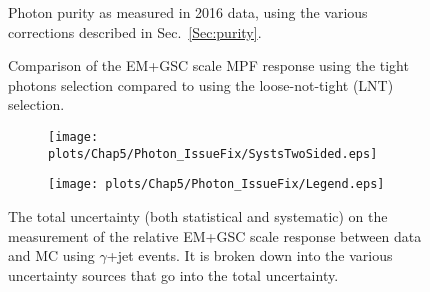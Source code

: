 \begin{figure}[!ht]
  \begin{center}
  \end{center}
  \caption[Photon purity in $\gamma$+jet events, 2016]
  {\small Photon purity as measured in 2016 data, using the various corrections described in Sec.~\ref{Sec:purity}. }
  \label{plot:GJetEM2016LNTApp}
\end{figure}

\begin{figure}[!ht]
  \begin{center}
  \end{center}
  \caption[EM scale response using $\gamma$+jet in 2016 using loose-not-tight photons]
  {\small Comparison of the EM+GSC scale MPF response using the tight photons selection compared to using the loose-not-tight (LNT) selection.}
  \label{plot:GJetEM2016LNTApp}
\end{figure}




\begin{figure}[!ht]
\captionsetup[subfigure]{labelformat=empty}
 \begin{center}
   \begin{subfigure}{0.55\textwidth}
     \hspace{-3cm}
     \texttt{[image: plots/Chap5/Photon\_IssueFix/SystsTwoSided.eps]}
   \end{subfigure}
   \begin{subfigure}{0.55\textwidth}     \hspace{-3cm}
     \texttt{[image: plots/Chap5/Photon\_IssueFix/Legend.eps]}
   \end{subfigure}
 \end{center}
 \caption[Uncertainty on the EM+GSC scale response measurement using $\gamma$+jet]
 {\small The total uncertainty (both statistical and systematic) on the measurement of the relative EM+GSC scale response between data and MC using $\gamma$+jet events.  It is broken down into the various uncertainty sources that go into the total uncertainty.  }
 \label{Fig:GJetSystsEM2016}
\end{figure}

